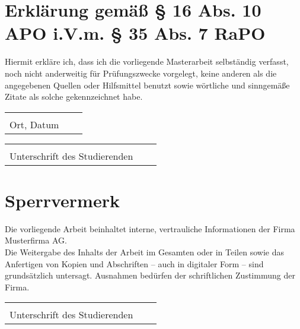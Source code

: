 \chapter*{Erklärung gemäß § 16 Abs. 10 APO i.V.m. § 35 Abs. 7 RaPO}
Hiermit erkläre ich, dass ich die vorliegende Masterarbeit selbständig verfasst, noch nicht anderweitig für Prüfungszwecke vorgelegt, keine anderen als die angegebenen Quellen oder Hilfsmittel benutzt sowie wörtliche und sinngemäße Zitate als solche gekennzeichnet habe.

\vspace{1,5 cm}
\begin{tabular}{p{7cm}p{.5cm}l}
	\hrulefill \\ 
	Ort, Datum
\end{tabular}%
\hfill 
\begin{tabular}{p{7cm}p{.5cm}l}
	\hrulefill \\ 
	Unterschrift des Studierenden 
\end{tabular}
\vspace{1,5 cm}

\newpage

\chapter*{Sperrvermerk}
Die vorliegende Arbeit beinhaltet interne, vertrauliche Informationen der Firma Musterfirma AG.\\
Die Weitergabe des Inhalts der Arbeit im Gesamten oder in Teilen sowie das Anfertigen von Kopien und Abschriften – auch in digitaler Form – sind grundsätzlich untersagt. Ausnahmen bedürfen der schriftlichen Zustimmung der Firma.

\vspace{1,5 cm}
\begin{tabular}{p{7cm}p{.5cm}l}
	\hrulefill \\ 
	Unterschrift des Studierenden
\end{tabular}%